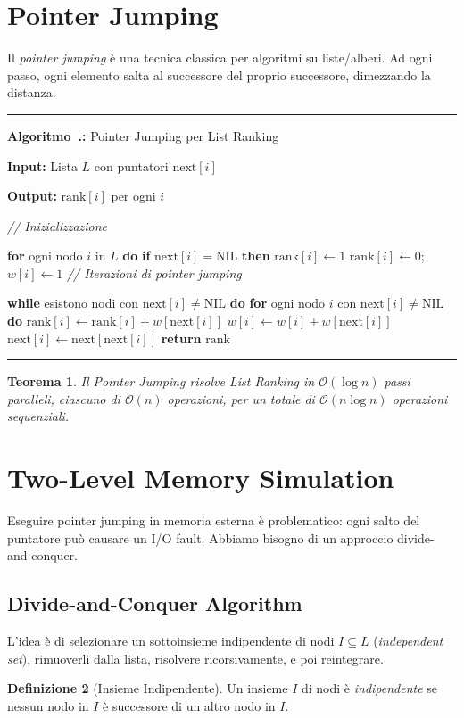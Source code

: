 \documentclass[12pt, a4paper, oneside]{book}
\newcounter{algocf}[chapter]
\renewcommand{\thealgocf}{\thechapter.\arabic{algocf}}
\newenvironment{algorithm}[1][H]{%
  \refstepcounter{algocf}%
  \par\medskip\noindent\rule{\linewidth}{0.4pt}\par\smallskip
}{%
  \par\smallskip\noindent\rule{\linewidth}{0.4pt}\par\medskip
}
\newcommand{\algcaption}[1]{\noindent\textbf{Algoritmo~\thealgocf:} #1\par\smallskip}
\newcommand{\KwIn}[1]{\noindent\textbf{Input:} #1\par}
\newcommand{\KwOut}[1]{\noindent\textbf{Output:} #1\par}
\newcommand{\tcp}[1]{{\color{gray}\textit{// #1}}\par}
\newcommand{\For}[1]{\noindent\textbf{for} #1 \textbf{do}}
\newcommand{\While}[1]{\noindent\textbf{while} #1 \textbf{do}}
\newcommand{\eIf}[1]{\noindent\textbf{if} #1 \textbf{then}}
\newcommand{\Return}[1]{\noindent\textbf{return} #1}
\theoremstyle{plain}
\newtheorem{teorema}{Teorema}[chapter]
\theoremstyle{definition}
\newtheorem{definizione}[teorema]{Definizione}
\theoremstyle{remark}
\newcommand{\OO}[1]{\mathcal{O}\!\left(#1\right)}
\begin{document}
\section{Pointer Jumping}

Il \emph{pointer jumping} è una tecnica classica per algoritmi su liste/alberi. Ad ogni passo, ogni elemento salta al successore del proprio successore, dimezzando la distanza.

\begin{algorithm}[H]
\algcaption{Pointer Jumping per List Ranking}
\KwIn{Lista $L$ con puntatori $\mathrm{next}[i]$}
\KwOut{$\mathrm{rank}[i]$ per ogni $i$}
\tcp{Inizializzazione}
\For{ogni nodo $i$ in $L$}{
  \eIf{$\mathrm{next}[i] = \mathrm{NIL}$}{
    $\mathrm{rank}[i] \leftarrow 1$\;
  }{
    $\mathrm{rank}[i] \leftarrow 0$;\quad $w[i] \leftarrow 1$\;
  }
}
\tcp{Iterazioni di pointer jumping}
\While{esistono nodi con $\mathrm{next}[i] \ne \mathrm{NIL}$}{
  \For{ogni nodo $i$ con $\mathrm{next}[i] \ne \mathrm{NIL}$}{
    $\mathrm{rank}[i] \leftarrow \mathrm{rank}[i] + w[\mathrm{next}[i]]$\;
    $w[i] \leftarrow w[i] + w[\mathrm{next}[i]]$\;
    $\mathrm{next}[i] \leftarrow \mathrm{next}[\mathrm{next}[i]]$\;
  }
}
\Return{$\mathrm{rank}$}\;
\end{algorithm}

\begin{teorema}
Il Pointer Jumping risolve List Ranking in $\OO{\log n}$ passi paralleli, ciascuno di $\OO{n}$ operazioni, per un totale di $\OO{n \log n}$ operazioni sequenziali.
\end{teorema}

\section{Two-Level Memory Simulation}

Eseguire pointer jumping in memoria esterna è problematico: ogni salto del puntatore può causare un I/O fault. Abbiamo bisogno di un approccio divide-and-conquer.

\subsection{Divide-and-Conquer Algorithm}

L'idea è di selezionare un sottoinsieme indipendente di nodi $I \subseteq L$ (\emph{independent set}), rimuoverli dalla lista, risolvere ricorsivamente, e poi reintegrare.

\begin{definizione}[Insieme Indipendente]
Un insieme $I$ di nodi è \emph{indipendente} se nessun nodo in $I$ è successore di un altro nodo in $I$.
\end{definizione}
\end{document}
